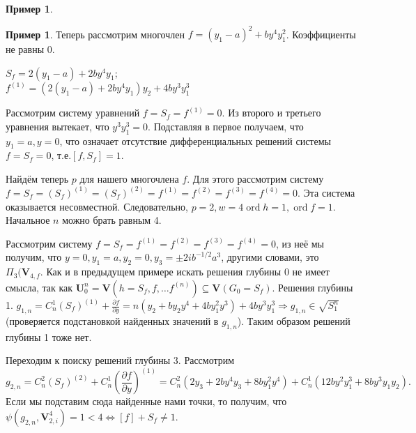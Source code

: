 \documentclass[16pt]{article}
\DeclareMathOperator{\ord}{ord}
\theoremstyle{plain}
\theoremstyle{definition}
\newtheorem{example}[theorem]{Пример}
\theoremstyle{remark}
\begin{document}
\begin{example}
\end{example}



\begin{example}
 Теперь рассмотрим многочлен $f =
(y_1-a)^2+by^4y_1^2$. Коэффициенты не равны 0.

$S_f=2(y_1-a)+2by^4y_1$;
\\
$f^{(1)}=(2(y_1-a)+2by^4y_1)y_2+4by^3y_1^3$

Рассмотрим систему уравнений $f=S_f=f^{(1)}=0$. Из второго и
третьего уравнения вытекает, что $y^3y_1^3=0$. Подставляя в первое
получаем, что $y_1=a, y=0$, что означает отсутствие дифференциальных
решений системы $f=S_f=0$, т.е.$[f,S_f]=1$.

Найдём теперь  $p$ для нашего многочлена $f$. Для этого рассмотрим
систему $f=S_f=(S_f)^{(1)}=(S_f)^{(2)}=f^{(1)}=f^{(2)}=f^{(3)}=f^{(4)}=0$. Эта система оказывается несовместной. Следовательно,
$p=2,w=4\ord{h}=1,\ord{f}=1$. Начальное $n$  можно брать равным 4.

Рассмотрим систему $f=S_f=f^{(1)}=f^{(2)}=f^{(3)}=f^{(4)}=0$, из неё мы получим, что $y=0,y_1=a,y_2=0,y_3=\pm2ib^{-1/2}a^3$, другими словами, это $\Pi_3(\mathbf{V}_{4,f}$. 
Как и в предыдущем примере искать решения глубины 0 не имеет смысла, так как $\mathbf{U}_0^n = \mathbf{V}(h=S_f,f,\ldots f^{(n)})\subseteq\mathbf{V}(G_0=S_f)$.  Решения глубины 1. $g_{1,n}=C_n^1(S_f)^{(1)}+\frac{\partial f}{\partial y}=n(y_2+by_2y^4+4by_1^2y^3)+4by^3y_1^3\Rightarrow g_{1,n}\in\sqrt{S_1^n}$ (проверяется подстановкой найденных значений в $g_{1,n}$).  Таким образом решений глубины 1 тоже нет.

Переходим к поиску решений глубины 3. Рассмотрим $$g_{2,n}=C_n^2(S_f)^{(2)}+C_n^1\left(\frac{\partial
f}{\partial
y}\right)^{(1)}=C_n^2(2y_3+2by^4y_3+8by_1^2y^4)+C_n^1(12by^2y_1^3+8by^3y_1y_2).$$
Если мы подставим сюда найденные нами точки, то получим, что
$\psi(g_{2,n},\mathbf{V}_{2,i}^4)= 1 <4\Leftrightarrow [f]+S_f\not=1.$


\end{example}
\end{document}
